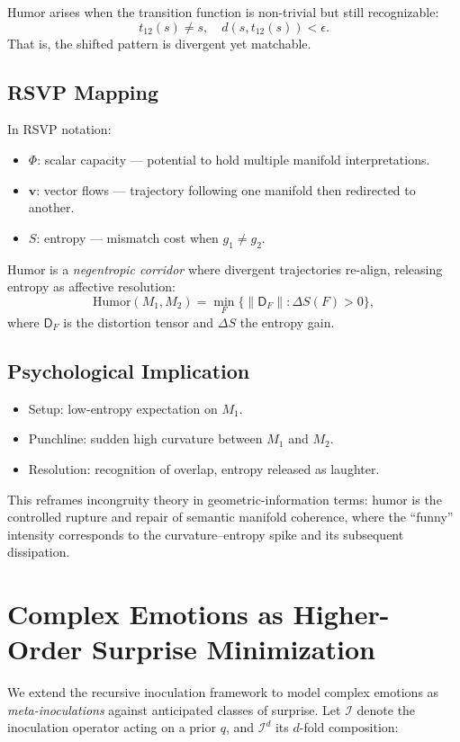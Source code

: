 \documentclass{article}
\theoremstyle{definition}
\begin{document}
Humor arises when the transition function is non-trivial but still recognizable:
\[
t_{12}(s) \neq s, \quad d(s, t_{12}(s)) < \epsilon.
\]
That is, the shifted pattern is divergent yet matchable.

\subsection{RSVP Mapping}

In RSVP notation:
\begin{itemize}
  \item $\Phi$: scalar capacity --- potential to hold multiple manifold interpretations.
  \item $\mathbf{v}$: vector flows --- trajectory following one manifold then redirected to another.
  \item $S$: entropy --- mismatch cost when $g_1 \neq g_2$.
\end{itemize}

Humor is a \emph{negentropic corridor} where divergent trajectories re-align, releasing entropy as affective resolution:
\[
\text{Humor}(M_1,M_2) =
\min_{F} \big\{ \|\mathsf{D}_F\| : \Delta S(F) > 0 \big\},
\]
where $\mathsf{D}_F$ is the distortion tensor and $\Delta S$ the entropy gain.

\subsection{Psychological Implication}

\begin{itemize}
  \item Setup: low-entropy expectation on $M_1$.
  \item Punchline: sudden high curvature between $M_1$ and $M_2$.
  \item Resolution: recognition of overlap, entropy released as laughter.
\end{itemize}

This reframes incongruity theory in geometric-information terms: humor is the controlled rupture and repair 
of semantic manifold coherence, where the ``funny'' intensity corresponds to the curvature–entropy spike 
and its subsequent dissipation.

\section{Complex Emotions as Higher-Order Surprise Minimization}

We extend the recursive inoculation framework to model complex emotions as 
\emph{meta-inoculations} against anticipated classes of surprise. Let 
$\mathcal{I}$ denote the inoculation operator acting on a prior $q$, and 
$\mathcal{I}^d$ its $d$-fold composition:
\end{document}
